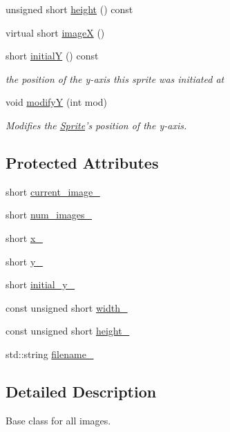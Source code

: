 \begin{DoxyCompactItemize}
unsigned short \hyperlink{classSprite_ae96d42c46af7aad1f9031da62f878b21}{height} () const 
\item 
virtual short \hyperlink{classSprite_a2703a7a7b2acc1dec83dd1c4f5054aef}{image\-X} ()
\item 
short \hyperlink{classSprite_aa12cd0f64262dcc3c72e0ba2fa39c82d}{initial\-Y} () const 
\begin{DoxyCompactList}\small\item\em the position of the y-\/axis this sprite was initiated at \end{DoxyCompactList}\item 
void \hyperlink{classSprite_a587e5f7d415b1210ffeb091c69818914}{modify\-Y} (int mod)
\begin{DoxyCompactList}\small\item\em Modifies the \hyperlink{classSprite}{Sprite}'s position of the y-\/axis. \end{DoxyCompactList}\end{DoxyCompactItemize}
\subsection*{Protected Attributes}
\begin{DoxyCompactItemize}
\item 
short \hyperlink{classSprite_a8654a8729656ba13695c20c2030de5d0}{current\-\_\-image\-\_\-}
\item 
short \hyperlink{classSprite_a5a6ae065c674bfb85b6d90c1cbfcdca2}{num\-\_\-images\-\_\-}
\item 
short \hyperlink{classSprite_ac66af2df2e5990c07252b8aa0d384346}{x\-\_\-}
\item 
short \hyperlink{classSprite_a3ad6d07d083c5bbb2e819caa31d2bc6f}{y\-\_\-}
\item 
short \hyperlink{classSprite_a2b5cccca24f3c3e0f466624cf034e8a9}{initial\-\_\-y\-\_\-}
\item 
const unsigned short \hyperlink{classSprite_ac0c8b57b52d82f2753c1726e51ed0490}{width\-\_\-}
\item 
const unsigned short \hyperlink{classSprite_ae2ddd489c30852d32b7a88d20af9df1e}{height\-\_\-}
\item 
std\-::string \hyperlink{classSprite_acb2c82f6bea52556153897e9270f219d}{filename\-\_\-}
\end{DoxyCompactItemize}


\subsection{Detailed Description}
Base class for all images. 

